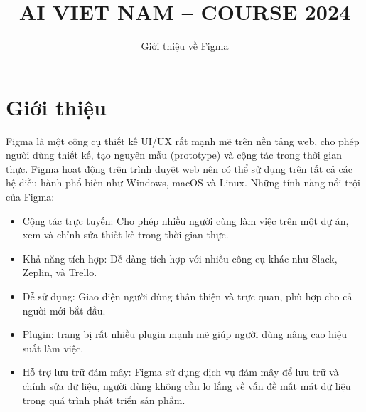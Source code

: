 \documentclass[11pt]{article}
\title{\LARGE AI VIET NAM – COURSE 2024}
\author{\Huge \begin{minipage}{\textwidth}\centering Giới thiệu về Figma \end{minipage}}
\begin{document}
\maketitle


\section{Giới thiệu}

Figma là một công cụ thiết kế UI/UX rất mạnh mẽ trên nền tảng web, cho phép người dùng thiết kế, tạo nguyên mẫu (prototype) và cộng tác trong thời gian thực. Figma hoạt động trên trình duyệt web nên có thể sử dụng trên tất cả các hệ điều hành phổ biến như Windows, macOS và Linux. Những tính năng nổi trội của Figma: 
\begin{itemize}
    \item Cộng tác trực tuyến: Cho phép nhiều người cùng làm việc trên một dự án, xem và chỉnh sửa thiết kế trong thời gian thực.
    \item Khả năng tích hợp: Dễ dàng tích hợp với nhiều công cụ khác như Slack, Zeplin, và Trello.
    \item Dễ sử dụng: Giao diện người dùng thân thiện và trực quan, phù hợp cho cả người mới bắt đầu.
    \item Plugin: trang bị rất nhiều plugin mạnh mẽ giúp người dùng nâng cao hiệu suất làm việc.
    \item Hỗ trợ lưu trữ đám mây: Figma sử dụng dịch vụ đám mây để lưu trữ và chỉnh sửa dữ liệu, người dùng không cần lo lắng về vấn đề mất mát dữ liệu trong quá trình phát triển sản phẩm.
\end{itemize}
\end{document}
